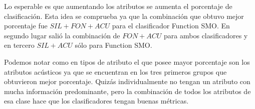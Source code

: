 Lo esperable es que aumentando los atributos se aumenta el porcentaje de clasificación. Esta idea se comprueba ya que la combinación que obtuvo mejor porcentaje fue $SIL+FON+ACU$ para el clasificador Function SMO. En segundo lugar salió la combinación de $FON+ACU$ para ambos clasificadores y en tercero $SIL+ACU$ sólo para Function SMO. 

Podemos notar como en tipos de atributo el que posee mayor porcentaje son los atributos acústicos ya que se encuentran en los tres primeros grupos que obtuvieron mejor porcentaje. Quizás individualmente no tengan un atributo con mucha información predominante, pero la combinación de todos los atributos de esa clase hace que los clasificadores tengan buenas métricas.